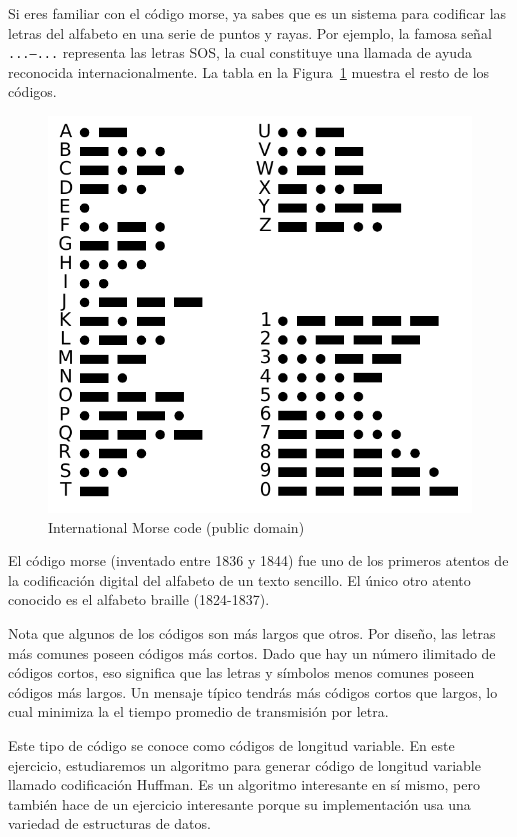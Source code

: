 Si eres familiar con el código morse, ya sabes que es un sistema
para codificar las letras del alfabeto en una serie de puntos
y rayas. Por ejemplo, la famosa señal {\tt ...---...} representa
las letras SOS, la cual constituye una llamada de ayuda reconocida
internacionalmente. La tabla en la Figura~\ref{fig.morse} 
muestra el resto de los códigos.

\begin{figure}
\centerline
{\includegraphics[scale=0.6]{figs/International_Morse_Code.pdf}}
\caption{International Morse code (public domain)}
\label{fig.morse}
\end{figure}

El código morse (inventado entre 1836 y 1844) fue uno de los
primeros atentos de la codificación digital del alfabeto de 
un texto sencillo. El único otro atento conocido es el 
alfabeto braille (1824-1837).

Nota que algunos de los códigos son más largos que otros. Por
diseño, las letras más comunes poseen códigos más cortos. Dado
que hay un número ilimitado de códigos cortos, eso significa que
las letras y símbolos menos comunes poseen códigos más largos.
Un mensaje típico tendrás más códigos cortos que largos, lo cual
minimiza la el tiempo promedio de transmisión por letra.

Este tipo de código se conoce como códigos de longitud variable. 
En este ejercicio, estudiaremos un algoritmo para generar código
de longitud variable llamado codificación Huffman. Es un algoritmo
interesante en sí mismo, pero también hace de un ejercicio interesante
porque su implementación usa una variedad de estructuras de datos.

